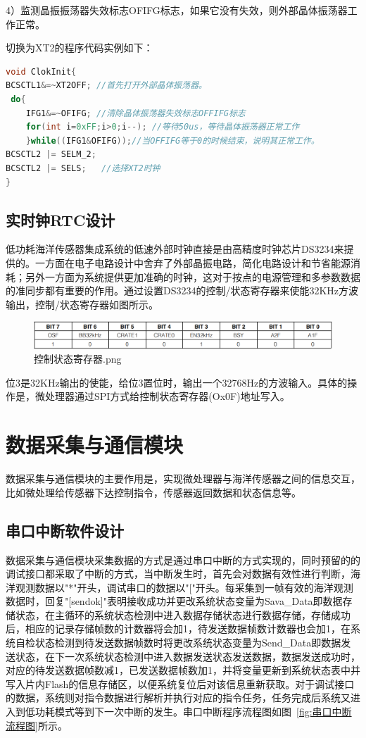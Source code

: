 4）监测晶振振荡器失效标志OFIFG标志，如果它没有失效，则外部晶体振荡器工作正常。

切换为XT2的程序代码实例如下：

\begin{lstlisting}[language=c++]
void ClokInit{
BCSCTL1&=~XT2OFF; //首先打开外部晶体振荡器。
 do{
    IFG1&=~OFIFG; //清除晶体振荡器失效标志OFFIFG标志
    for(int i=0xFF;i>0;i--); //等待50us，等待晶体振荡器正常工作
    }while((IFG1&OFIFG));//当OFFIFG等于0的时候结束，说明其正常工作。
BCSCTL2 |= SELM_2;
BCSCTL2 |= SELS;   //选择XT2时钟
}
\end{lstlisting}

\subsection{实时钟RTC设计}
低功耗海洋传感器集成系统的低速外部时钟直接是由高精度时钟芯片DS3234来提供的。一方面在电子电路设计中舍弃了外部晶振电路，简化电路设计和节省能源消耗；另外一方面为系统提供更加准确的时钟，这对于按点的电源管理和多参数数据的准同步都有重要的作用。通过设置DS3234的控制/状态寄存器来使能32KHz方波输出，控制/状态寄存器如图所示。

\begin{figure}[ht]
    \centering
	\includegraphics[width=1\textwidth]{fig/控制状态寄存器.png}
	\caption{控制状态寄存器.png}
	\label{fig:控制/状态寄存器}
\end{figure}
位3是32KHz输出的使能，给位3置位时，输出一个32768Hz的方波输入。具体的操作是，微处理器通过SPI方式给控制状态寄存器(Ox0F)地址写入。
\section{数据采集与通信模块}
数据采集与通信模块的主要作用是，实现微处理器与海洋传感器之间的信息交互，比如微处理给传感器下达控制指令，传感器返回数据和状态信息等。
\subsection{串口中断软件设计}
数据采集与通信模块采集数据的方式是通过串口中断的方式实现的，同时预留的的调试接口都采取了中断的方式，当中断发生时，首先会对数据有效性进行判断，海洋观测数据以"*"开头，调试串口的数据以"["开头。每采集到一帧有效的海洋观测数据时，回复"[sendok]"表明接收成功并更改系统状态变量为Sava\_Data即数据存储状态，在主循环的系统状态检测中进入数据存储状态进行数据存储，存储成功后，相应的记录存储帧数的计数器将会加1，待发送数据帧数计数器也会加1，在系统自检状态检测到待发送数据帧数时将更改系统状态变量为Send\_Data即数据发送状态，在下一次系统状态检测中进入数据发送状态发送数据，数据发送成功时，对应的待发送数据帧数减1，已发送数据帧数加1，并将变量更新到系统状态表中并写入片内Flash的信息存储区，以便系统复位后对该信息重新获取。对于调试接口的数据，系统则对指令数据进行解析并执行对应的指令任务，任务完成后系统又进入到低功耗模式等到下一次中断的发生。串口中断程序流程图如图~\ref{fig:串口中断流程图}所示。

